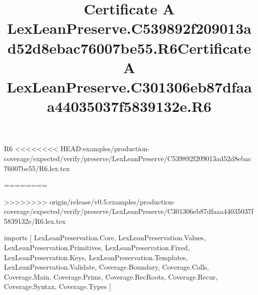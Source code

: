 \begin{lexlean}{R6}
<<<<<<<< HEAD:examples/production-coverage/expected/verify/preserve/LexLeanPreserve/C539892f209013ad52d8ebac76007be55/R6.lex.tex
\title{Certificate A LexLeanPreserve.C539892f209013ad52d8ebac76007be55.R6}
========
\title{Certificate A LexLeanPreserve.C301306eb87dfaaa44035037f5839132e.R6}
>>>>>>>> origin/release/v0.5:examples/production-coverage/expected/verify/preserve/LexLeanPreserve/C301306eb87dfaaa44035037f5839132e/R6.lex.tex
\begin{coremodule}
imports [
  LexLeanPreservation.Core,
  LexLeanPreservation.Values,
  LexLeanPreservation.Primitives,
  LexLeanPreservation.Fixed,
  LexLeanPreservation.Keys,
  LexLeanPreservation.Templates,
  LexLeanPreservation.Validate,
  Coverage.Boundary,
  Coverage.Colls,
  Coverage.Main,
  Coverage.Prims,
  Coverage.RecRoots,
  Coverage.Recur,
  Coverage.Syntax,
  Coverage.Types
]


\end{coremodule}
\end{lexlean}
